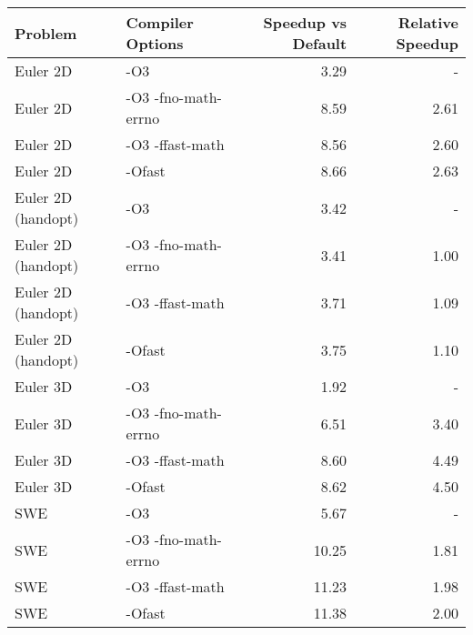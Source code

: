 \begin{tabular}{llrr}
\toprule
Problem & Compiler Options & Speedup vs Default & Relative Speedup \\
\midrule
Euler 2D & -O3 & 3.29 & - \\
Euler 2D & -O3 -fno-math-errno & 8.59 & 2.61 \\
Euler 2D & -O3 -ffast-math & 8.56 & 2.60 \\
Euler 2D & -Ofast & 8.66 & 2.63 \\
Euler 2D (handopt) & -O3 & 3.42 & - \\
Euler 2D (handopt) & -O3 -fno-math-errno & 3.41 & 1.00 \\
Euler 2D (handopt) & -O3 -ffast-math & 3.71 & 1.09 \\
Euler 2D (handopt) & -Ofast & 3.75 & 1.10 \\
Euler 3D & -O3 & 1.92 & - \\
Euler 3D & -O3 -fno-math-errno & 6.51 & 3.40 \\
Euler 3D & -O3 -ffast-math & 8.60 & 4.49 \\
Euler 3D & -Ofast & 8.62 & 4.50 \\
SWE & -O3 & 5.67 & - \\
SWE & -O3 -fno-math-errno & 10.25 & 1.81 \\
SWE & -O3 -ffast-math & 11.23 & 1.98 \\
SWE & -Ofast & 11.38 & 2.00 \\
\bottomrule
\end{tabular}
